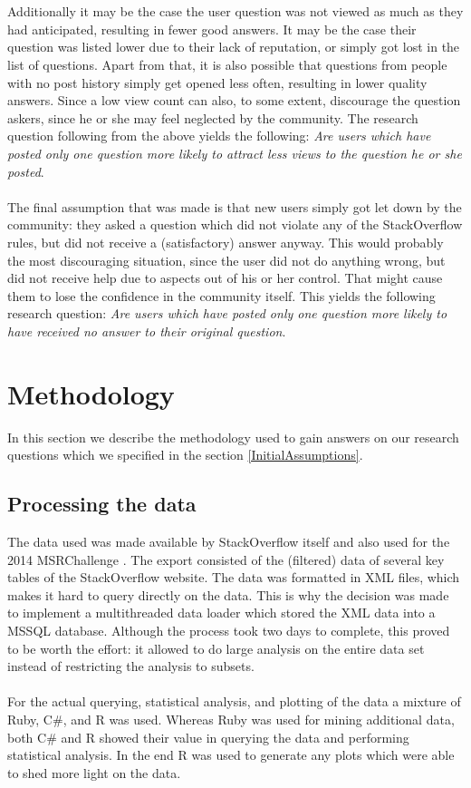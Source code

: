 \documentclass[conference]{IEEEtran}
\begin{document}
\\
\\
Additionally it may be the case the user question was not viewed as much as they had anticipated, resulting in fewer good answers. It may be the case their question was listed lower due to their lack of reputation, or simply got lost in the list of questions. Apart from that, it is also possible that questions from people with no post history simply get opened less often, resulting in lower quality answers. Since a low view count can also, to some extent, discourage the question askers, since he or she may feel neglected by the community. The research question following from the above yields the following: \textit{Are users which have posted only one question more likely to attract less views to the question he or she posted}.
\\
\\
The final assumption that was made is that new users simply got let down by the community: they asked a question which did not violate any of the StackOverflow rules, but did not receive a (satisfactory) answer anyway. This would probably the most discouraging situation, since the user did not do anything wrong, but did not receive help due to aspects out of his or her control. That might cause them to lose the confidence in the community itself. This yields the following research question: \textit{Are users which have posted only one question more likely to have received no answer to their original question}. 

\section{Methodology}
\label{Methodology}

In this section we describe the methodology used to gain answers on our research questions which we specified in the section \ref{InitialAssumptions}.

\subsection{Processing the data}

The data used was made available by StackOverflow itself and also used for the 2014 MSRChallenge \cite{MSRChallenge2015}. The export consisted of the (filtered) data of several key tables of the StackOverflow website. The data was formatted in XML files, which makes it hard to query directly on the data. This is why the decision was made to implement a multithreaded data loader which stored the XML data into a MSSQL database. Although the process took two days to complete, this proved to be worth the effort: it allowed to do large analysis on the entire data set instead of restricting the analysis to subsets.
\\
\\
For the actual querying, statistical analysis, and plotting of the data a mixture of Ruby, C\#, and R was used. Whereas Ruby was used for mining additional data,  both C\# and R showed their value in querying the data and performing statistical analysis. In the end R was used to generate any plots which were able to shed more light on the data.
\end{document}
